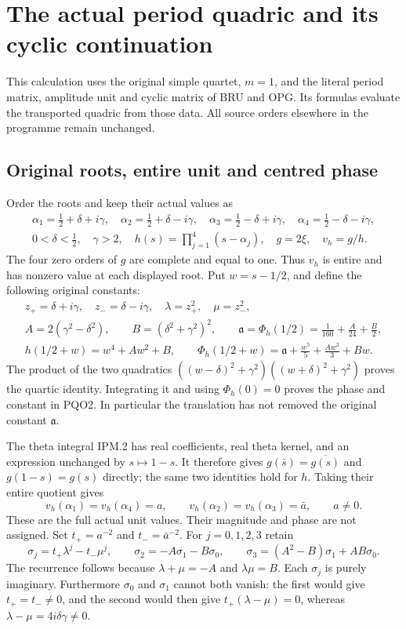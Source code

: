 \documentclass[11pt,a4paper]{article}
\begin{document}

\clearpage
\section{The actual period quadric and its cyclic continuation}
\label{sec:PQO}

This calculation uses the original simple quartet, $m=1$, and the
literal period matrix, amplitude unit and cyclic matrix of BRU and
OPG. Its formulas evaluate the transported quadric from those data.
All source orders elsewhere in the programme remain unchanged.

\subsection{Original roots, entire unit and centred phase}
Order the roots and keep their actual values as
\[
\begin{gathered}
 \alpha_1=\tfrac12+\delta+i\gamma,\quad
 \alpha_2=\tfrac12+\delta-i\gamma,\quad
 \alpha_3=\tfrac12-\delta+i\gamma,\quad
 \alpha_4=\tfrac12-\delta-i\gamma,\\
 0<\delta<\tfrac12,\quad\gamma>2,\quad
 h(s)=\prod_{j=1}^4(s-\alpha_j),\quad g=2\xi,\quad v_h=g/h.
\end{gathered}\tag{PQO1}
\]
The four zero orders of $g$ are complete and equal to one.
Thus $v_h$ is entire and has nonzero value at each displayed root.
Put $w=s-1/2$, and define the following original constants:
\[
\begin{gathered}
 z_+=\delta+i\gamma,\quad z_-=\delta-i\gamma,\quad
 \lambda=z_+^2,\quad\mu=z_-^2,\\
 A=2(\gamma^2-\delta^2),\qquad B=(\delta^2+\gamma^2)^2,\qquad
 \mathfrak a=\Phi_h(1/2)=\frac1{160}+\frac A{24}+\frac B2,\\
 h(1/2+w)=w^4+Aw^2+B,\qquad
 \Phi_h(1/2+w)=\mathfrak a+\frac{w^5}{5}+\frac{Aw^3}{3}+Bw.
\end{gathered}\tag{PQO2}
\]
The product of the two quadratics
$((w-\delta)^2+\gamma^2)((w+\delta)^2+\gamma^2)$ proves the
quartic identity. Integrating it and using $\Phi_h(0)=0$
proves the phase and constant in PQO2. In particular the translation
has not removed the original constant $\mathfrak a$.

The theta integral IPM.2 has real coefficients, real theta kernel,
and an expression unchanged by $s\mapsto1-s$. It therefore gives
$g(\bar s)=\overline{g(s)}$ and $g(1-s)=g(s)$ directly; the same
two identities hold for $h$. Taking their entire quotient gives
\[
 v_h(\alpha_1)=v_h(\alpha_4)=a,\qquad
 v_h(\alpha_2)=v_h(\alpha_3)=\bar a,\qquad a\ne0.
 \tag{PQO3}
\]
These are the full actual unit values. Their magnitude and phase
are not assigned. Set $t_+=a^{-2}$ and $t_-=\bar a^{-2}$.
For $j=0,1,2,3$ retain
\[
 \sigma_j=t_+\lambda^j-t_-\mu^j,\qquad
 \sigma_2=-A\sigma_1-B\sigma_0,\qquad
 \sigma_3=(A^2-B)\sigma_1+AB\sigma_0.
 \tag{PQO4}
\]
The recurrence follows because $\lambda+\mu=-A$ and
$\lambda\mu=B$. Each $\sigma_j$ is purely imaginary.
Furthermore $\sigma_0$ and $\sigma_1$ cannot both vanish:
the first would give $t_+=t_-\ne0$, and the second would then
give $t_+(\lambda-\mu)=0$, whereas
$\lambda-\mu=4i\delta\gamma\ne0$.
\end{document}

